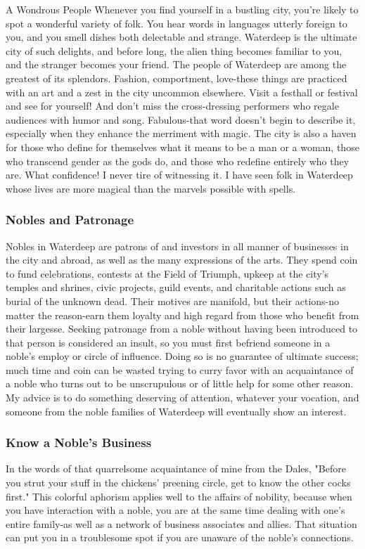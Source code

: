 \documentclass[10pt,a4paper,twoside,twocolumn,openany,nodeprecatedcode]{dndbook}
\begin{document}
\begin{DndComment}{A Wondrous People}
Whenever you find yourself in a bustling city, you're likely to spot a wonderful variety of folk. You hear words in languages utterly foreign to you, and you smell dishes both delectable and strange. Waterdeep is the ultimate city of such delights, and before long, the alien thing becomes familiar to you, and the stranger becomes your friend.
The people of Waterdeep are among the greatest of its splendors. Fashion, comportment, love-these things are practiced with an art and a zest in the city uncommon elsewhere. Visit a festhall or festival and see for yourself! And don't miss the cross-dressing performers who regale audiences with humor and song. Fabulous-that word doesn't begin to describe it, especially when they enhance the merriment with magic.
The city is also a haven for those who define for themselves what it means to be a man or a woman, those who transcend gender as the gods do, and those who redefine entirely who they are. What confidence! I never tire of witnessing it. I have seen folk in Waterdeep whose lives are more magical than the marvels possible with spells.
\end{DndComment}

\subsubsection{Nobles and Patronage}
Nobles in Waterdeep are patrons of and investors in all manner of businesses in the city and abroad, as well as the many expressions of the arts. They spend coin to fund celebrations, contests at the Field of Triumph, upkeep at the city's temples and shrines, civic projects, guild events, and charitable actions such as burial of the unknown dead. Their motives are manifold, but their actions-no matter the reason-earn them loyalty and high regard from those who benefit from their largesse.
Seeking patronage from a noble without having been introduced to that person is considered an insult, so you must first befriend someone in a noble's employ or circle of influence. Doing so is no guarantee of ultimate success; much time and coin can be wasted trying to curry favor with an acquaintance of a noble who turns out to be unscrupulous or of little help for some other reason. My advice is to do something deserving of attention, whatever your vocation, and someone from the noble families of Waterdeep will eventually show an interest.
\subsubsection{Know a Noble's Business}
In the words of that quarrelsome acquaintance of mine from the Dales, "Before you strut your stuff in the chickens' preening circle, get to know the other cocks first." This colorful aphorism applies well to the affairs of nobility, because when you have interaction with a noble, you are at the same time dealing with one's entire family-as well as a network of business associates and allies. That situation can put you in a troublesome spot if you are unaware of the noble's connections.
\end{document}
